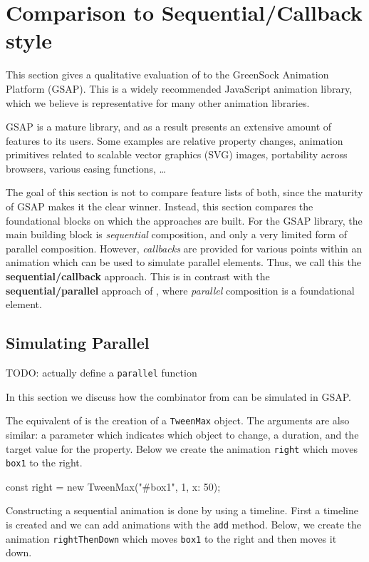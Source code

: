 \section{Comparison to Sequential/Callback style}
\label{sec:evaluation}

This section gives a qualitative evaluation of \dsl{} to the GreenSock Animation Platform (GSAP). This is a widely recommended JavaScript animation library, which we believe is representative for many other animation libraries.

GSAP is a mature library, and as a result presents an extensive amount of features to its users. Some examples are relative property changes, animation primitives related to scalable vector graphics (SVG) images, portability across browsers, various easing functions, \ldots

The goal of this section is not to compare feature lists of both, since the maturity of GSAP makes it the clear winner. Instead, this section compares the foundational blocks on which the approaches are built. For the GSAP library, the main building block is \emph{sequential} composition, and only a very limited form of parallel composition. However, \emph{callbacks} are provided for various points within an animation which can be used to simulate parallel elements. Thus, we call this the \textbf{sequential/callback} approach. This is in contrast with the \textbf{sequential/parallel} approach of \dsl{}, where \emph{parallel} composition is a foundational element.

\subsection{Simulating Parallel}

TODO: actually define a \texttt{parallel} function

In this section we discuss how the  combinator from \dsl{} can be simulated in GSAP.

The equivalent of  is the creation of a \texttt{TweenMax} object. The arguments are also similar:  a parameter which indicates which object to change, a duration, and the target value for the property. Below we create the animation \texttt{right} which moves \texttt{box1} to the right.

\begin{js}
const right = new TweenMax("#box1", 1, {x: 50});
\end{js}

Constructing a sequential animation is done by using a timeline. First a timeline is created and we can add animations with the \texttt{add} method. Below, we create the animation \texttt{rightThenDown} which moves \texttt{box1} to the right and then moves it down.

